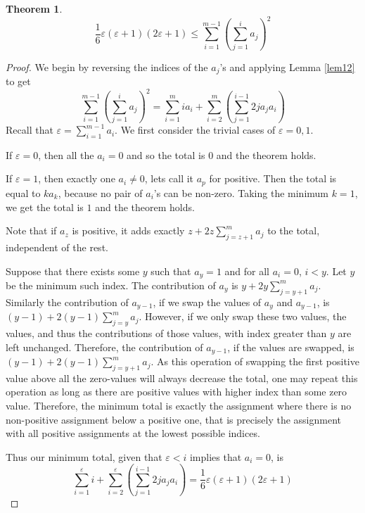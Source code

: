 \documentclass[12pt]{amsart}
\newtheorem{theorem}{Theorem}
\begin{document}
\begin{theorem}
\label{lem13}
	$$\frac{1}{6} \varepsilon (\varepsilon + 1) (2 \varepsilon+ 1) \leq \sum_{i=1}^{m-1} \left( \sum_{j=1}^{i} a_j \right)^2$$
\end{theorem}
\begin{proof}
	We begin by reversing the indices of the $a_j$'s and applying Lemma \ref{lem12} to get
	$$\sum_{i=1}^{m-1} \left( \sum_{j=1}^{i} a_j \right)^2 = \sum_{i=1}^{m} i a_i  + \sum_{i=2}^{m} \left( \sum_{j=1}^{i-1} 2 j a_j a_i \right)$$
	Recall that $\varepsilon = \sum_{i=1}^{m-1} a_i$.
	We first consider the trivial cases of $\varepsilon = 0, 1$.
	
		If $\varepsilon = 0$, then all the $a_i = 0$ and so the total is $0$ and the theorem holds.

		If $\varepsilon = 1$, then exactly one $a_i \neq 0$, lets call it $a_p$ for positive. 
		Then the total is equal to $k a_k$, because no pair of $a_i$'s can be non-zero. 
		Taking the minimum $k = 1$, we get the total is $1$ and the theorem holds.

	Note that if $a_z$ is positive, it adds exactly $z + 2 z \sum_{j=z+1}^{m} a_j$ to the total, independent of the rest.
		
	Suppose that there exists some $y$ such that $a_y = 1$ and for all $a_i = 0$, $i < y$. Let $y$ be the minimum such index. 
		The contribution of $a_y$ is $y + 2 y \sum_{j=y+1}^{m} a_j$. Similarly the contribution of $a_{y-1}$, if we swap the values of $a_y$ and $a_{y-1}$, is $(y-1) + 2 (y-1) \sum_{j=y}^{m} a_j$. However, if we only swap these two values, the values, and thus the contributions of those values, with index greater than $y$ are left unchanged. 
		Therefore, the contribution of $a_{y-1}$, if the values are swapped, is \\ $(y-1) + 2 (y-1) \sum_{j=y+1}^{m} a_j$.
		As this operation of swapping the first positive value above all the zero-values will always decrease the total, one may repeat this operation as long as there are positive values with higher index than some zero value.
		Therefore, the minimum total is exactly the assignment where there is no non-positive assignment below a positive one, that is precisely the assignment with all positive assignments at the lowest possible indices.

	Thus our minimum total, given that $\varepsilon < i$ implies that $a_i = 0$, is
	$$\sum_{i=1}^{\varepsilon} i + \sum_{i=2}^{\varepsilon} \left( \sum_{j=1}^{i-1} 2 j a_j a_i \right) = \frac{1}{6} \varepsilon (\varepsilon + 1) (2 \varepsilon+ 1)$$
\end{proof}
\end{document}
